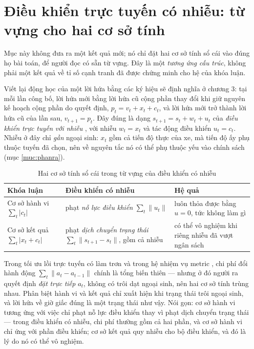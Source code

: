 \section{Điều khiển trực tuyến có nhiễu: từ vựng cho hai cơ sở tính}
\label{muc:dieukhien}

Mục này không đưa ra một kết quả mới; nó chỉ đặt hai cơ sở tính sổ cái vào đúng họ bài toán, để
người đọc có sẵn từ vựng. Đây là một \emph{tương ứng cấu trúc}, không phải một kết quả về tỉ số
cạnh tranh đã được chứng minh cho hệ của khóa luận.

Viết lại động học của một lời hứa bằng các ký hiệu sẽ định nghĩa ở chương 3: tại mỗi lần công bố,
lời hứa mới bằng lời hứa cũ cộng phần thay đổi khi giữ nguyên kế hoạch cộng phần do quyết định,
$p_t = v_t + x_t + c_t$, và lời hứa mới trở thành lời hứa cũ của lần sau, $v_{t+1} = p_t$. Đây đúng
là dạng $s_{t+1} = s_t + w_t + u_t$ của \emph{điều khiển trực tuyến với nhiễu} \cite{agarwal2019},
với nhiễu $w_t = x_t$ và tác động điều khiển $u_t = c_t$. Nhiễu ở đây chỉ \emph{gần} ngoại sinh:
$x_t$ gồm cả tiến độ thực của xe, mà tiến độ ấy phụ thuộc tuyến đã chọn, nên về nguyên tắc nó có
thể phụ thuộc yếu vào chính sách (mục \ref{muc:phanra}).

\begin{table}[htbp]
\centering
\caption{Hai cơ sở tính sổ cái trong từ vựng của điều khiển có nhiễu}
\label{bang:dieukhien}
\small
\begin{tabular}{@{}p{3.6cm}p{4.6cm}p{5.4cm}@{}}
\toprule
\textbf{Khóa luận} & \textbf{Điều khiển có nhiễu} & \textbf{Hệ quả}\\
\midrule
Cơ sở hành vi $\sum_t |c_t|$ & phạt \emph{nỗ lực điều khiển} $\sum_t \|u_t\|$ & luôn thỏa được bằng
$u = 0$, tức không làm gì\\
Cơ sở kết quả $\sum_t |x_t + c_t|$ & phạt \emph{dịch chuyển trạng thái}
$\sum_t \|s_{t+1} - s_t\|$, gồm cả nhiễu & có thể vô nghiệm khi riêng nhiễu đã vượt ngân sách\\
\bottomrule
\end{tabular}
\end{table}

Trong tối ưu lồi trực tuyến có làm trơn \cite{chen2018} và trong hệ nhiệm vụ metric
\cite{borodin1992}, chi phí đổi hành động $\sum_t \|a_t - a_{t-1}\|$ chính là tổng biến thiên ---
nhưng ở đó người ra quyết định \emph{đặt trực tiếp} $a_t$, không có trôi dạt ngoại sinh, nên hai cơ
sở tính trùng nhau. Phân biệt hành vi và kết quả chỉ xuất hiện khi trạng thái trôi ngoại sinh, và
lời hứa về giờ giấc đúng là một trạng thái như vậy. Nói gọn: cơ sở hành vi tương ứng với việc chỉ
phạt nỗ lực điều khiển thay vì phạt dịch chuyển trạng thái --- trong điều khiển có nhiễu, chi phí
thường gồm cả hai phần, và cơ sở hành vi chỉ ứng với phần điều khiển; cơ sở kết quả quy nhiễu cho
bộ điều khiển, và đó là lý do nó có thể vô nghiệm.

